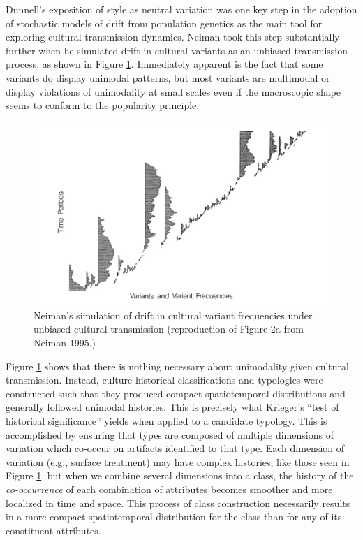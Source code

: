 Dunnell's \citeyearpar{Dunnell1978} exposition of style as neutral
variation was one key step in the adoption of stochastic models of drift
from population genetics as the main tool for exploring cultural
transmission dynamics. Neiman \citeyearpar{Neiman1995} took this step
substantially further when he simulated drift in cultural variants as an
unbiased transmission process, as shown in Figure \ref{img:neiman-fig2}.
Immediately apparent is the fact that some variants do display unimodal
patterns, but most variants are multimodal or display violations of
unimodality at small scales even if the macroscopic shape seems to
conform to the popularity principle.

\begin{figure}[ht]
\centering
\includegraphics[scale=0.6]{graphics/multipleseriation/neiman-1995-figure2a.pdf}
\caption{Neiman's simulation of drift in cultural variant frequencies under unbiased cultural transmission (reproduction of Figure 2a from Neiman 1995.)}
\label{img:neiman-fig2}
\end{figure}

Figure \ref{img:neiman-fig2} shows that there is nothing
necessary about unimodality given cultural transmission.  Instead, culture-historical 
classifications and typologies were constructed such that they produced compact
spatiotemporal distributions and generally followed unimodal histories.  This is precisely
what Krieger's \citeyearpar{Krieger1944} ``test of historical significance'' yields when applied to a candidate
typology.
This is accomplished by ensuring that types are composed of multiple
dimensions of variation which co-occur on artifacts identified to that
type.  Each dimension of variation (e.g., surface treatment) may have complex histories,
like those seen in Figure \ref{img:neiman-fig2}, but when we combine several dimensions into a class, 
the history of the \emph{co-occurrence} of each combination of attributes becomes smoother and more 
localized in time and space.  This process of class construction necessarily results in a 
more compact spatiotemporal distribution for the class than for any of its constituent attributes.

